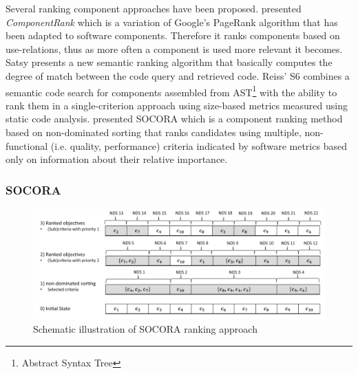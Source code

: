 Several ranking component approaches have been proposed. \citet{Inoue2005} presented \emph{ComponentRank} which is a variation of Google's PageRank algorithm that has been adapted to software components. Therefore it ranks components based on use-relations, thus as more often a component is used more relevant it becomes. Satsy\cite{Stolee2016} presents a new semantic ranking algorithm that basically computes the degree of match between the code query and retrieved code. Reiss' S6\cite{Reiss2009} combines a semantic code search for components assembled from AST\footnote{Abstract Syntax Tree} with the ability to rank them in a single-criterion approach using size-based metrics measured using static code analysis. \citet{Kessel2016} presented SOCORA which is a component ranking method based on non-dominated sorting that ranks candidates using multiple, non-functional (i.e. quality, performance) criteria indicated by software metrics based only on information about their relative importance\cite{Kessel2016}.

\subsubsection{SOCORA}

\begin{figure}[ht]
	\centering
    \includegraphics[width=\textwidth]{grafiken/socoraExample}
    \caption{Schematic illustration of SOCORA ranking approach \cite{Kessel2016}}
    \label{fig:socora-ex}
\end{figure}

